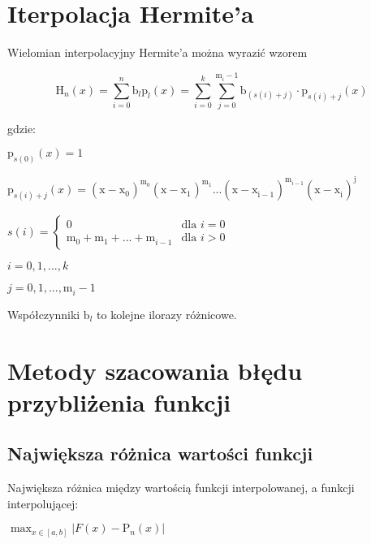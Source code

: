 \documentclass{article}
\begin{document}
\section{Iterpolacja Hermite'a}

Wielomian interpolacyjny Hermite'a można wyrazić wzorem

\[\mathrm{H}_{n}^{}(x) = \sum_{i = 0}^{n}\mathrm{b}_{l}^{}\mathrm{p}_{l}^{}(x) = 
\sum_{i = 0}^{k}\sum_{j=0}^{\mathrm{m}_{i}^{} - 1}\mathrm{b}_{(s(i) + j)}^{} \cdot 
\mathrm{p}_{s(i) + j}^{}(x) \]

\noindent
gdzie:

\bigbreak

\(\mathrm{p}_{s(0)}^{}(x) = 1\) 

\indent

\(\mathrm{p}_{s(i) + j}^{}(x) = \mathrm{(\mathrm{x - \mathrm{x}_{0}^{}}_{}^{})}_{}^{\mathrm{m}_{0}^{}}
\mathrm{(\mathrm{x - \mathrm{x}_{1}^{}}_{}^{})}_{}^{\mathrm{m}_{1}^{}}...
\mathrm{(\mathrm{x - \mathrm{x}_{i - 1}^{}}_{}^{})}_{}^{\mathrm{m}_{i-1}^{}}
\mathrm{(\mathrm{x - \mathrm{x}_{i}^{}}_{}^{})}_{}^{\mathrm{j}_{}^{}}\)

\indent

\(
s(i) = 
\begin{cases}
    0 & \text{dla } i = 0 \\
    \mathrm{m}_{0}^{} + \mathrm{m}_{1}^{} + ... + \mathrm{m}_{i - 1}^{} & \text{dla } i > 0
\end{cases}
\)

\indent

\(i = 0, 1, ..., k\)

\indent

\(j = 0,1,...,\mathrm{m}_{i}^{} - 1\)

\indent

Współczynniki \(\mathrm{b}_{l}^{}\) to kolejne ilorazy różnicowe.

\section{Metody szacowania błędu przybliżenia funkcji}

\subsection{Największa różnica wartości funkcji}

Największa różnica między wartością funkcji interpolowanej, a funkcji interpolującej:

\begin{center}
    \(\max_{x\in [a, b]} |F(x) - \mathrm{P}_{n}^{}(x)|\)
\end{center}
\end{document}

